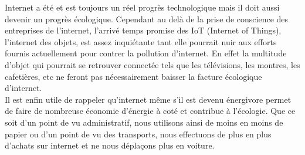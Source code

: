 \documentclass[a4paper,twocolumn,12pt]{article}
\begin{document}
	Internet a été et est toujours un réel progrès technologique mais il doit aussi devenir un progrès écologique. Cependant au delà de la prise de conscience des entreprises de l'internet, l’arrivé temps promise des IoT (Internet of Things), l’internet des objets, est assez inquiétante tant elle pourrait nuir aux efforts fournis actuellement pour contrer la pollution d’internet. En effet la multitude d’objet qui pourrait se retrouver connectée tels que les télévisions, les montres, les cafetières, etc ne feront pas nécessairement baisser la facture écologique d’internet. \\
	
	Il est enfin utile de rappeler qu'internet même s'il est devenu énergivore permet de faire de nombreuse économie d'énergie à coté et contribue à l'écologie. Que ce soit d'un point de vu administratif, nous utilisons ainsi de moins en moins de papier ou d'un point de vu des transports, nous effectuons de plus en plus d'achats sur internet et ne nous déplaçons plus en voiture.





\end{document}
